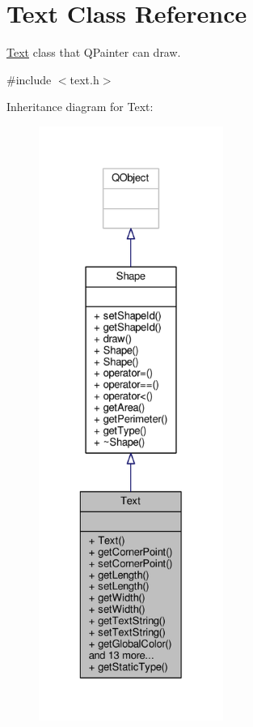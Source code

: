 \hypertarget{classText}{}\section{Text Class Reference}
\label{classText}


\hyperlink{classText}{Text} class that Q\+Painter can draw.  




{\ttfamily \#include $<$text.\+h$>$}



Inheritance diagram for Text\+:\nopagebreak
\begin{figure}[H]
\begin{center}
\leavevmode
\includegraphics[height=550pt]{classText__inherit__graph}
\end{center}
\end{figure}


